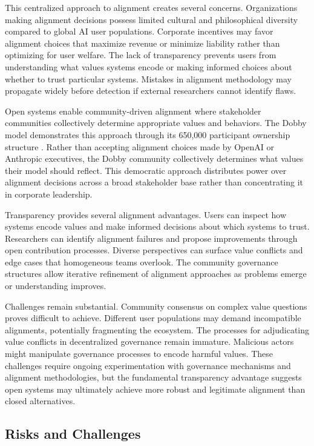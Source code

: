 This centralized approach to alignment creates several concerns. Organizations making alignment decisions possess limited cultural and philosophical diversity compared to global AI user populations. Corporate incentives may favor alignment choices that maximize revenue or minimize liability rather than optimizing for user welfare. The lack of transparency prevents users from understanding what values systems encode or making informed choices about whether to trust particular systems. Mistakes in alignment methodology may propagate widely before detection if external researchers cannot identify flaws.

Open systems enable community-driven alignment where stakeholder communities collectively determine appropriate values and behaviors. The Dobby model demonstrates this approach through its 650,000 participant ownership structure \cite{dobby2025}. Rather than accepting alignment choices made by OpenAI or Anthropic executives, the Dobby community collectively determines what values their model should reflect. This democratic approach distributes power over alignment decisions across a broad stakeholder base rather than concentrating it in corporate leadership.

Transparency provides several alignment advantages. Users can inspect how systems encode values and make informed decisions about which systems to trust. Researchers can identify alignment failures and propose improvements through open contribution processes. Diverse perspectives can surface value conflicts and edge cases that homogeneous teams overlook. The community governance structures allow iterative refinement of alignment approaches as problems emerge or understanding improves.

Challenges remain substantial. Community consensus on complex value questions proves difficult to achieve. Different user populations may demand incompatible alignments, potentially fragmenting the ecosystem. The processes for adjudicating value conflicts in decentralized governance remain immature. Malicious actors might manipulate governance processes to encode harmful values. These challenges require ongoing experimentation with governance mechanisms and alignment methodologies, but the fundamental transparency advantage suggests open systems may ultimately achieve more robust and legitimate alignment than closed alternatives.

\subsection{Risks and Challenges}

